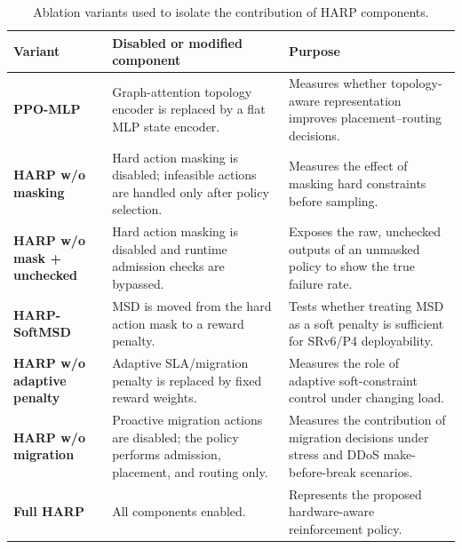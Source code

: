 \documentclass[final,5p]{elsarticle}
\begin{document}
\begin{table}[t]
\centering
\caption{Ablation variants used to isolate the contribution of HARP components.}
\label{tab:ablation_variants}
\renewcommand{\arraystretch}{1.12}
\small
\begin{tabular}{p{2.8cm}p{4.5cm}p{6.2cm}}
\toprule
\textbf{Variant} & \textbf{Disabled or modified component} & \textbf{Purpose} \\
\midrule
\textbf{PPO-MLP} &
Graph-attention topology encoder is replaced by a flat MLP state encoder. &
Measures whether topology-aware representation improves placement--routing decisions. \\

\textbf{HARP w/o masking} &
Hard action masking is disabled; infeasible actions are handled only after policy selection. &
Measures the effect of masking hard constraints before sampling. \\

\textbf{HARP w/o mask + unchecked} &
Hard action masking is disabled and runtime admission checks are bypassed. &
Exposes the raw, unchecked outputs of an unmasked policy to show the true failure rate. \\

\textbf{HARP-SoftMSD} &
MSD is moved from the hard action mask to a reward penalty. &
Tests whether treating MSD as a soft penalty is sufficient for SRv6/P4 deployability. \\

\textbf{HARP w/o adaptive penalty} &
Adaptive SLA/migration penalty is replaced by fixed reward weights. &
Measures the role of adaptive soft-constraint control under changing load. \\

\textbf{HARP w/o migration} &
Proactive migration actions are disabled; the policy performs admission, placement, and routing only. &
Measures the contribution of migration decisions under stress and DDoS make-before-break scenarios. \\

\textbf{Full HARP} &
All components enabled. &
Represents the proposed hardware-aware reinforcement policy. \\
\bottomrule
\end{tabular}
\end{table}
\end{document}
